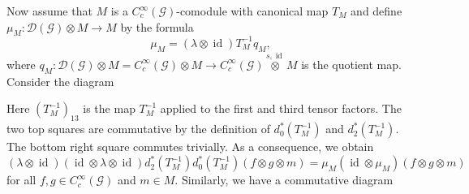 \documentclass{amsart}
\newcommand{\G}{\mathcal{G}}
\newcommand{\DG}{\mathcal{D}(\mathcal{G})}
\newcommand{\ccinfty}{C_c^\infty}
\DeclareMathOperator{\id}{id}
\begin{document}
Now assume that $ M $ is a $ \ccinfty(\G) $-comodule with canonical map $ T_M $ and define $ \mu_M: \DG \otimes M \rightarrow M $ by the formula 
$$ 
\mu_M = (\lambda \otimes \id) T^{-1}_M q_M, 
$$
where $ q_M: \DG \otimes M = \ccinfty(\G) \otimes M \rightarrow \ccinfty(\G)\stackrel{s,\id}{\otimes} M $ is the quotient map. 
Consider the diagram 
\begin{center}
\end{center}    
Here $ (T^{-1}_M)_{13} $ is the map $ T^{-1}_M $ applied to the first and third tensor factors. 
The two top squares are commutative by the definition of $ d_0^*(T^{-1}_M) $ and $ d_2^*(T^{-1}_M) $. The bottom right square commutes trivially. As a consequence, we obtain
$$
(\lambda \otimes \id)(\id \otimes \lambda \otimes \id) d_2^*(T^{-1}_M)d_0^*(T^{-1}_M)(f \otimes g \otimes m) = \mu_M(\id \otimes \mu_M)(f \otimes g \otimes m)
$$
for all $ f,g \in \ccinfty(\G) $ and $ m \in M $. Similarly, we have a commutative diagram 
\begin{center}
\end{center}
\end{document}
